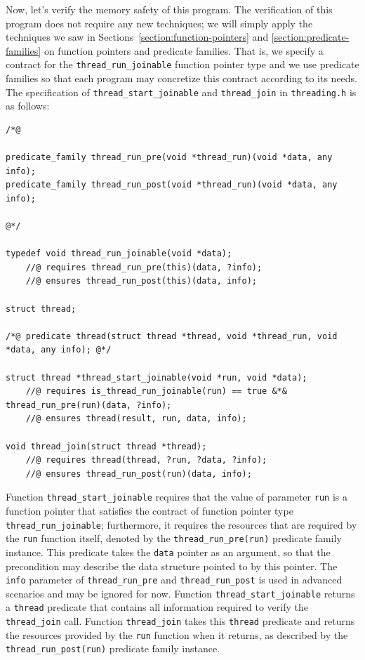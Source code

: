 \documentclass{article}
\begin{document}
Now, let's verify the memory safety of this program. The
verification of this program does not require any new
techniques; we will simply apply the techniques we saw in
Sections~\ref{section:function-pointers} and
\ref{section:predicate-families} on function pointers and
predicate families. That is, we specify a contract for the
\lstinline!thread_run_joinable! function pointer type and we use
predicate families so that each program may concretize this
contract according to its needs. The specification of
\lstinline!thread_start_joinable! and \lstinline!thread_join! in
\texttt{threading.h} is as follows:
\begin{lstlisting}
/*@

predicate_family thread_run_pre(void *thread_run)(void *data, any info);
predicate_family thread_run_post(void *thread_run)(void *data, any info);

@*/

typedef void thread_run_joinable(void *data);
    //@ requires thread_run_pre(this)(data, ?info);
    //@ ensures thread_run_post(this)(data, info);

struct thread;

/*@ predicate thread(struct thread *thread, void *thread_run, void *data, any info); @*/

struct thread *thread_start_joinable(void *run, void *data);
    //@ requires is_thread_run_joinable(run) == true &*& thread_run_pre(run)(data, ?info);
    //@ ensures thread(result, run, data, info);

void thread_join(struct thread *thread);
    //@ requires thread(thread, ?run, ?data, ?info);
    //@ ensures thread_run_post(run)(data, info);
\end{lstlisting}
Function \lstinline!thread_start_joinable! requires that the value of
parameter \lstinline!run! is a function pointer that satisfies
the contract of function pointer type \lstinline!thread_run_joinable!;
furthermore, it requires the resources that are required by the
\lstinline!run! function itself, denoted by the
\lstinline!thread_run_pre(run)! predicate family instance. This
predicate takes the \lstinline!data! pointer as an
argument, so that the precondition may describe the data
structure pointed to by this pointer. The \lstinline!info!
parameter of \lstinline!thread_run_pre! and
\lstinline!thread_run_post! is used in advanced scenarios and
may be ignored for now. Function \lstinline!thread_start_joinable!
returns a \lstinline!thread! predicate that contains all
information required to verify the \lstinline!thread_join!
call. Function \lstinline!thread_join! takes this
\lstinline!thread! predicate and returns the resources provided
by the \lstinline!run! function when it returns, as described
by the \lstinline!thread_run_post(run)! predicate family
instance.
\end{document}

